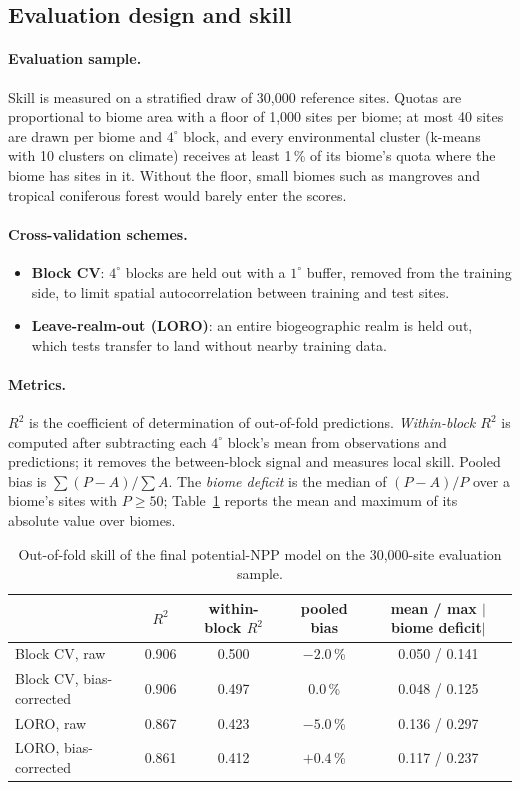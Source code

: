 \documentclass[11pt,a4paper]{article}
\begin{document}
\subsection{Evaluation design and skill}
\label{sec:skill}

\paragraph{Evaluation sample.} Skill is measured on a stratified draw of 30,000 reference sites.
Quotas are proportional to biome area with a floor of 1,000 sites per biome; at most 40 sites are
drawn per biome and $4^\circ$ block, and every environmental cluster (k-means with 10 clusters on
climate) receives at least 1\,\% of its biome's quota where the biome has sites in it. Without the floor, small biomes such as
mangroves and tropical coniferous forest would barely enter the scores.

\paragraph{Cross-validation schemes.}
\begin{itemize}
\item \textbf{Block CV}: $4^\circ$ blocks are held out with a $1^\circ$ buffer, removed from the
training side, to limit spatial autocorrelation between training and test sites.
\item \textbf{Leave-realm-out (LORO)}: an entire biogeographic realm is held out, which tests
transfer to land without nearby training data.
\end{itemize}

\paragraph{Metrics.} $R^2$ is the coefficient of determination of out-of-fold predictions.
\emph{Within-block $R^2$} is computed after subtracting each $4^\circ$ block's mean from
observations and predictions; it removes the between-block signal and measures local skill.
Pooled bias is $\sum (P - A) / \sum A$. The \emph{biome deficit} is the median of $(P-A)/P$ over a
biome's sites with $P \ge 50$; Table~\ref{tab:skill} reports the mean and maximum of its absolute
value over biomes.

\begin{table}[H]
\centering\small
\caption{Out-of-fold skill of the final potential-NPP model on the 30,000-site evaluation
sample.}
\label{tab:skill}
\begin{tabular}{lcccc}
\toprule
 & $R^2$ & within-block $R^2$ & pooled bias & mean / max $|$biome deficit$|$ \\
\midrule
Block CV, raw & 0.906 & 0.500 & $-2.0$\,\% & 0.050 / 0.141 \\
Block CV, bias-corrected & 0.906 & 0.497 & $0.0$\,\% & 0.048 / 0.125 \\
LORO, raw & 0.867 & 0.423 & $-5.0$\,\% & 0.136 / 0.297 \\
LORO, bias-corrected & 0.861 & 0.412 & $+0.4$\,\% & 0.117 / 0.237 \\
\bottomrule
\end{tabular}
\end{table}
\end{document}
